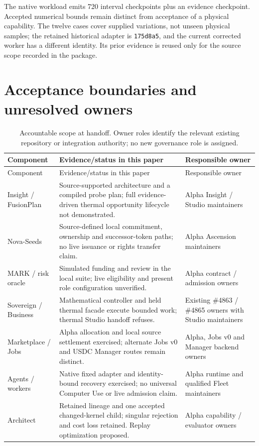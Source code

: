 \documentclass[11pt,a4paper]{article}
\begin{document}
The native workload emits 720 interval checkpoints plus an evidence checkpoint. Accepted numerical bounds remain distinct from acceptance of a physical capability. The twelve cases cover supplied variations, not unseen physical samples; the retained historical adapter is \texttt{175d8a5}, and the current corrected worker has a different identity. Its prior evidence is reused only for the source scope recorded in the package.

\section{Acceptance boundaries and unresolved owners}\label{app:owners}
\begin{longtable}{@{}P{31mm}P{77mm}P{46mm}@{}}
\caption{Accountable scope at handoff. Owner roles identify the relevant existing repository or integration authority; no new governance role is assigned.}\label{tab:owners}\\
\toprule
Component & Evidence/status in this paper & Responsible owner\\
\midrule
\endfirsthead
\toprule
Component & Evidence/status in this paper & Responsible owner\\
\midrule
\endhead
Insight / FusionPlan & Source-supported architecture and a compiled probe plan; full evidence-driven thermal opportunity lifecycle not demonstrated. & Alpha Insight / Studio maintainers\\
Nova-Seeds & Source-defined local commitment, ownership and successor-token paths; no live issuance or rights transfer claim. & Alpha Ascension maintainers\\
MARK / risk oracle & Simulated funding and review in the local suite; live eligibility and present role configuration unverified. & Alpha contract / admission owners\\
Sovereign / Business & Mathematical controller and held thermal facade execute bounded work; thermal Studio handoff refuses. & Existing \#4863 / \#4865 owners with Studio maintainers\\
Marketplace / Jobs & Alpha allocation and local source settlement exercised; alternate Jobs v0 and USDC Manager routes remain distinct. & Alpha, Jobs v0 and Manager backend owners\\
Agents / workers & Native fixed adapter and identity-bound recovery exercised; no universal Computer Use or live admission claim. & Alpha runtime and qualified Fleet maintainers\\
Architect & Retained lineage and one accepted changed-kernel child; singular rejection and cost loss retained. Replay optimization proposed. & Alpha capability / evaluator owners\\

\end{longtable}
\end{document}
